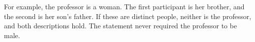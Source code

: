 For example, the professor is a woman. The first participant is her brother, and the second is her son's father. If these are distinct people, neither is the professor, and both descriptions hold. The statement never required the professor to be male.
